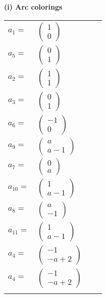 \documentclass[1p]{elsarticle_modified}
\theoremstyle{definition}
\begin{document}
\flushleft \textbf{(i) Arc colorings}\\
\begin{tabular}{m{7pt} m{180pt} m{7pt} m{180pt} }
\flushright $a_{1}=$&$\begin{pmatrix}1\\0\end{pmatrix}$ \\
\flushright $a_{5}=$&$\begin{pmatrix}0\\1\end{pmatrix}$ \\
\flushright $a_{2}=$&$\begin{pmatrix}1\\1\end{pmatrix}$ \\
\flushright $a_{3}=$&$\begin{pmatrix}0\\1\end{pmatrix}$ \\
\flushright $a_{6}=$&$\begin{pmatrix}-1\\0\end{pmatrix}$ \\
\flushright $a_{9}=$&$\begin{pmatrix}a\\a-1\end{pmatrix}$ \\
\flushright $a_{7}=$&$\begin{pmatrix}0\\a\end{pmatrix}$ \\
\flushright $a_{10}=$&$\begin{pmatrix}1\\a-1\end{pmatrix}$ \\
\flushright $a_{8}=$&$\begin{pmatrix}a\\-1\end{pmatrix}$ \\
\flushright $a_{11}=$&$\begin{pmatrix}1\\a-1\end{pmatrix}$ \\
\flushright $a_{4}=$&$\begin{pmatrix}-1\\- a+2\end{pmatrix}$\\ \flushright $a_{4}=$&$\begin{pmatrix}-1\\- a+2\end{pmatrix}$\\&\end{tabular}
\end{document}
